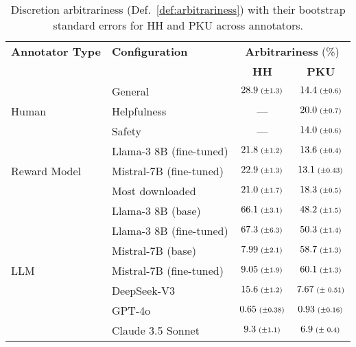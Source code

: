 \documentclass{article}
\begin{document}
\begin{table}[tb]
    \caption{Discretion arbitrariness (Def.~\ref{def:arbitrariness}) with their bootstrap standard errors for HH and PKU across annotators.}
    \label{table:arbitrariness-hh-pku}
    \centering
    \small
    \begin{tabular}{llcc}
    \toprule
    \textbf{Annotator Type} & \textbf{Configuration} & \multicolumn{2}{c}{\textbf{Arbitrariness} (\%)} \\
    \cmidrule(lr){3-4}
     &  & \textbf{HH} & \textbf{PKU} \\
    \midrule
    \multirow{3}{*}{Human} 
    & General & $28.9 \textrm{\scriptsize{ ($\pm$1.3)}}$ & $14.4 \textrm{\scriptsize{ ($\pm$0.6)}}$ \\
    & Helpfulness & --- & $20.0 \textrm{\scriptsize{ ($\pm$0.7)}}$ \\
    & Safety & --- & $14.0 \textrm{\scriptsize{ ($\pm$0.6)}}$ \\
    \midrule
    \multirow{3}{*}{Reward Model} 
    & Llama-3 8B (fine-tuned) & $21.8 \textrm{\scriptsize{ ($\pm$1.2)}}$ & $13.6 \textrm{\scriptsize{ ($\pm$0.4)}}$ \\
    & Mistral-7B (fine-tuned) & $22.9 \textrm{\scriptsize{ ($\pm$1.3)}}$ & $13.1 \textrm{\scriptsize{ ($\pm$0.43)}}$ \\
    & Most downloaded & $21.0 \textrm{\scriptsize{ ($\pm$1.7)}}$ & $18.3 \textrm{\scriptsize{ ($\pm$0.5)}}$ \\
    \midrule
    \multirow{7}{*}{LLM} 
    & Llama-3 8B (base) & $66.1 \textrm{\scriptsize{ ($\pm$3.1)}}$ & $48.2 \textrm{\scriptsize{ ($\pm$1.5)}}$ \\
    & Llama-3 8B (fine-tuned) & $67.3 \textrm{\scriptsize{ ($\pm$6.3)}}$ & $50.3 \textrm{\scriptsize{ ($\pm$1.4)}}$ \\
    & Mistral-7B (base) & $7.99 \textrm{\scriptsize{ ($\pm$2.1)}}$ & $58.7 \textrm{\scriptsize{ ($\pm$1.3)}}$ \\
    & Mistral-7B (fine-tuned) & $9.05 \textrm{\scriptsize{ ($\pm$1.9)}}$ & $60.1 \textrm{\scriptsize{ ($\pm$1.3)}}$ \\
    & DeepSeek-V3 & $15.6 \textrm{\scriptsize{ ($\pm$1.2)}}$ & $7.67 \textrm{\scriptsize{ ($\pm$ 0.51)}}$ \\
    & GPT-4o & $0.65 \textrm{\scriptsize{ ($\pm$0.38)}}$ & $0.93 \textrm{\scriptsize{ ($\pm$0.16)}}$ \\
    & Claude 3.5 Sonnet & $9.3 \textrm{\scriptsize{ ($\pm$1.1)}}$ & $6.9 \textrm{\scriptsize{ ($\pm$ 0.4)}}$ \\
    \bottomrule
\end{tabular}
\end{table}
\end{document}
